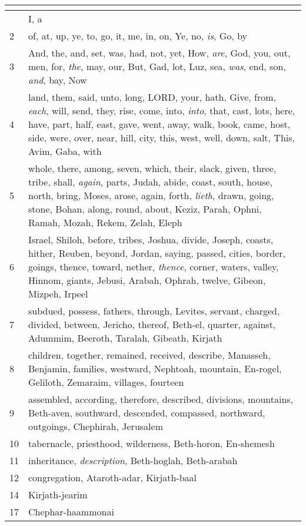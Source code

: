 \begin{center}
\begin{longtable}{l|p{3.75in}}
\hline \multicolumn{2}{c}{{ }} \\ \hline
\endfoot 
1 & I, a\\ \hline 
2 & of, at, up, ye, to, go, it, me, in, on, Ye, no, \emph{is}, Go, by\\ \hline 
3 & And, the, and, set, was, had, not, yet, How, \emph{are}, God, you, out, men, for, \emph{the}, may, our, But, Gad, lot, Luz, sea, \emph{was}, end, son, \emph{and}, bay, Now\\ \hline 
4 & land, them, said, unto, long, LORD, your, hath, Give, from, \emph{each}, will, send, they, rise, come, into, \emph{into}, that, cast, lots, here, have, part, half, east, gave, went, away, walk, book, came, host, side, were, over, near, hill, city, this, west, well, down, salt, This, Avim, Gaba, with\\ \hline 
5 & whole, there, among, seven, which, their, slack, given, three, tribe, shall, \emph{again}, parts, Judah, abide, coast, south, house, north, bring, Moses, arose, again, forth, \emph{lieth}, drawn, going, stone, Bohan, along, round, about, Keziz, Parah, Ophni, Ramah, Mozah, Rekem, Zelah, Eleph\\ \hline 
6 & Israel, Shiloh, before, tribes, Joshua, divide, Joseph, coasts, hither, Reuben, beyond, Jordan, saying, passed, cities, border, goings, thence, toward, nether, \emph{thence}, corner, waters, valley, Hinnom, giants, Jebusi, Arabah, Ophrah, twelve, Gibeon, Mizpeh, Irpeel\\ \hline 
7 & subdued, possess, fathers, through, Levites, servant, charged, divided, between, Jericho, thereof, Beth-el, quarter, against, Adummim, Beeroth, Taralah, Gibeath, Kirjath\\ \hline 
8 & children, together, remained, received, describe, Manasseh, Benjamin, families, westward, Nephtoah, mountain, En-rogel, Geliloth, Zemaraim, villages, fourteen\\ \hline 
9 & assembled, according, therefore, described, divisions, mountains, Beth-aven, southward, descended, compassed, northward, outgoings, Chephirah, Jerusalem\\ \hline 
10 & tabernacle, priesthood, wilderness, Beth-horon, En-shemesh\\ \hline 
11 & inheritance, \emph{description}, Beth-hoglah, Beth-arabah\\ \hline 
12 & congregation, Ataroth-adar, Kirjath-baal\\ \hline 
14 & Kirjath-jearim\\ \hline 
17 & Chephar-haammonai\\ \hline 
\end{longtable}
\end{center}






